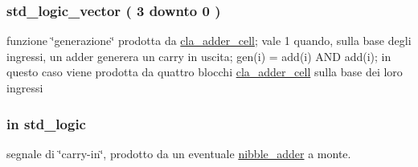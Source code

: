 \subsubsection[{\texorpdfstring{carry}{carry}}]{ {\bfseries \textcolor{vhdlchar}{std\+\_\+logic\+\_\+vector}\textcolor{vhdlchar}{ }\textcolor{vhdlchar}{(}\textcolor{vhdlchar}{ }\textcolor{vhdlchar}{ } \textcolor{vhdldigit}{3} \textcolor{vhdlchar}{ }\textcolor{vhdlchar}{downto}\textcolor{vhdlchar}{ }\textcolor{vhdlchar}{ } \textcolor{vhdldigit}{0} \textcolor{vhdlchar}{ }\textcolor{vhdlchar}{)}\textcolor{vhdlchar}{ }} \hspace{0.3cm}{\ttfamily [Signal]}}\hypertarget{group___nibble_adder_ga8f5524d80e551d479327a16bb32abcaa}{}\label{group___nibble_adder_ga8f5524d80e551d479327a16bb32abcaa}
funzione \char`\"{}generazione\char`\"{} prodotta da \hyperlink{classcla__adder__cell}{cla\+\_\+adder\+\_\+cell}; vale 1 quando, sulla base degli ingressi, un adder generera\textquotesingle{} un carry in uscita; gen(i) = add(i) A\+ND add(i); in questo caso viene prodotta da quattro blocchi \hyperlink{classcla__adder__cell}{cla\+\_\+adder\+\_\+cell} sulla base dei loro ingressi 
\subsubsection[{\texorpdfstring{carryin}{carryin}}]{ {\bfseries \textcolor{vhdlchar}{in}\textcolor{vhdlchar}{ }} {\bfseries \textcolor{vhdlchar}{std\+\_\+logic}\textcolor{vhdlchar}{ }} \hspace{0.3cm}{\ttfamily [Port]}}\hypertarget{group___nibble_adder_gaa556a73dc4a4de1a0d662b25adbcbe33}{}\label{group___nibble_adder_gaa556a73dc4a4de1a0d662b25adbcbe33}


segnale di \char`\"{}carry-\/in\char`\"{}, prodotto da un eventuale \hyperlink{classnibble__adder}{nibble\+\_\+adder} a monte. 

\subsubsection[{\texorpdfstring{cla\+\_\+adder\+\_\+cell}{cla_adder_cell}}]{ {\bfseries \textcolor{vhdlchar}{ }} \hspace{0.3cm}{\ttfamily [Component]}}\hypertarget{group___nibble_adder_ga4f13eb52457f650b1d2cd352d9cacca9}{}\label{group___nibble_adder_ga4f13eb52457f650b1d2cd352d9cacca9}
